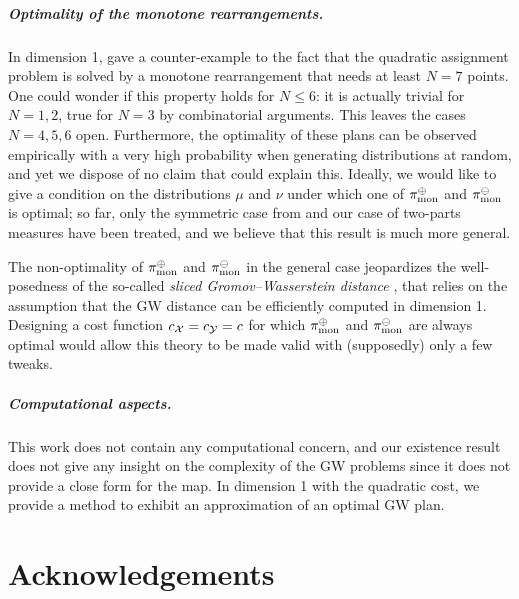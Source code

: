 \paragraph{Optimality of the monotone rearrangements.} In dimension 1,
\cite{beinert2022assignment} gave a counter-example to the fact that the quadratic assignment problem is solved by a monotone rearrangement that needs at least $N=7$ points. One could wonder if this property holds for $N\leq 6$: it is actually trivial for $N=1,2$, true for $N=3$ by combinatorial arguments. This leaves the cases $N=4,5,6$ open. Furthermore, the optimality of these plans can be observed empirically with a very high probability when generating distributions at random, and yet we dispose of no claim that could explain this. Ideally, we would like to give a condition on the distributions $\mu$ and $\nu$ under which one of $\pi_\text{mon}^\oplus$ and $\pi_\text{mon}^\ominus$ is optimal; so far, only the symmetric case from \cite{sturm2012space} and our case of two-parts measures have been treated, and we believe that this result is much more general.

The non-optimality of $\pi_\text{mon}^\oplus$ and $\pi_\text{mon}^\ominus$ in the general case jeopardizes the well-posedness of the so-called \emph{sliced Gromov--Wasserstein distance} \cite{vayer2019sliced,vayer2020contribution}, that relies on the assumption that the GW distance can be efficiently computed in dimension 1. Designing a cost function $c_{\mathcal{X}}=c_{\mathcal{Y}}=c$ for which $\pi_\text{mon}^\oplus$ and $\pi_\text{mon}^\ominus$ are always optimal would allow this theory to be made valid with (supposedly) only a few tweaks.

\paragraph{Computational aspects.} This work does not contain any computational concern, and our existence result does not give any insight on the complexity of the GW problems since it does not provide a close form for the map. In dimension 1 with the quadratic cost, we provide a method to exhibit an approximation of an optimal GW plan.



\chapter*{Acknowledgements}

